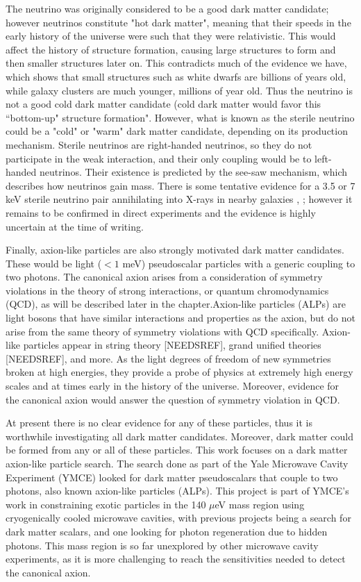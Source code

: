\documentclass[12pt,twosides]{book}
\begin{document}
The neutrino was originally considered to be a good dark matter candidate; however neutrinos constitute "hot dark matter", meaning that their speeds in the early history of the universe were such that they were relativistic. This would affect the history of structure formation, causing large structures to form and then smaller structures later on. This contradicts much of the evidence we have, which shows that small structures such as white dwarfs are billions of years old, while galaxy clusters are much younger, millions of year old. Thus the neutrino is not a good cold dark matter candidate (cold dark matter would favor this ``bottom-up" structure formation". However, what is known as the sterile neutrino could be a "cold" or "warm" dark matter candidate, depending on its production mechanism. Sterile neutrinos are right-handed neutrinos, so they do not participate in the weak interaction, and their only coupling would be to left-handed neutrinos. Their existence is predicted by the see-saw mechanism, which describes how neutrinos gain mass. There is some tentative evidence for a 3.5 or 7 keV sterile neutrino pair annihilating into X-rays in nearby galaxies \cite{bulbul14}, \cite{boyarsky14}; however it remains to be confirmed in direct experiments and the evidence is highly uncertain at the time of writing.

Finally, axion-like particles are also strongly motivated dark matter candidates. These would be light ($< 1$ meV) pseudoscalar particles with a generic coupling to two photons. The canonical axion arises from a consideration of symmetry violations in the theory of strong interactions, or quantum chromodynamics (QCD), as will be described later in the chapter.Axion-like particles (ALPs) are light bosons that have similar interactions and properties as the axion, but do not arise from the same theory of symmetry violations with QCD specifically. Axion-like particles appear in string theory [NEEDSREF], grand unified theories [NEEDSREF], and more. As the light degrees of freedom of new symmetries broken at high energies, they provide a probe of physics at extremely high energy scales and at times early in the history of the universe. Moreover, evidence for the canonical axion would answer the question of symmetry violation in QCD.

At present there is no clear evidence for any of these particles, thus it is worthwhile investigating all dark matter candidates. Moreover, dark matter could be formed from any or all of these particles. This work focuses on a dark matter axion-like particle search.  The search done as part of the Yale Microwave Cavity Experiment (YMCE) looked for dark matter pseudoscalars that couple to two photons, also known axion-like particles (ALPs). This project is part of YMCE's work in constraining exotic particles in the 140 $\mu$eV mass region using cryogenically cooled microwave cavities, with previous projects being a search for dark matter scalars, and one looking for photon regeneration due to hidden photons. This mass region is so far unexplored by other microwave cavity experiments, as it is more challenging to reach the sensitivities needed to detect the canonical axion.
\end{document}
